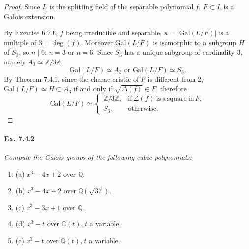 \documentclass[11pt,a4paper]{article}
\newcommand{\be} {\begin{enumerate}}
\newcommand{\ee} {\end{enumerate}}
\newcommand{\Q}{\mathbb{Q}}
\newcommand{\Z}{\mathbb{Z}}
\newcommand{\C}{\mathbb{C}}
\newcommand{\Gal}{\mathrm{Gal}}
\begin{document}
\begin{proof}
Since $L$ is the splitting field of the separable polynomial $f$, $F \subset L$ is a Galois extension.

By Exercise 6.2.6, $f$ being irreducible and separable, $n = \vert \Gal(L/F) \vert $ is a multiple of $3 = \deg(f)$. Moreover $\Gal(L/F)$ is isomorphic to a subgroup $H$ of $S_3$, so $n \mid 6$: $n=3$ or $n=6$. Since $S_3$ has a unique subgroup of cardinality 3, namely $A_3 \simeq \Z/3\Z$,
$$\Gal(L/F) \simeq A_3 \text{ or } \Gal(L/F) \simeq S_3.$$ 
By Theorem 7.4.1, since the characteristic of $F$ is different from 2, $\Gal(L/F) \simeq H \subset A_3$ if and only if $\sqrt{\Delta(f)} \in F$, therefore
$$
\Gal(L/F) \simeq 
\left\{
\begin{array}{ll}
 \Z/3\Z, &   \mathrm{if}\ \Delta(f)\ \mathrm{is}\  \mathrm{a}\  \mathrm{square}\  \mathrm{in} \ F,   \\
  S_3,&        \mathrm{otherwise.}
\end{array}
\right.
$$
\end{proof}

\paragraph{Ex. 7.4.2}

{\it Compute the Galois groups of the following cubic polynomials:
\be
\item[(a)] $x^3-4x+2$ over $\Q$.
\item[(b)] $x^3 - 4x+2$ over $\Q(\sqrt{37})$.
\item[(c)] $x^3-3x+1$ over $\Q$.
\item[(d)] $x^3-t$ over $\C(t)$, $t$ a variable.
\item[(e)] $x^3 - t$ over $\Q(t)$, $t$ a variable.
\ee
}
\end{document}
